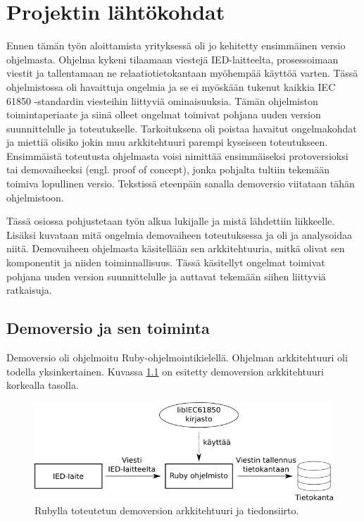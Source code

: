 \chapter{Projektin lähtökohdat}
\label{ch:projektin-lähtökohdat}
Ennen tämän työn aloittamista yrityksessä oli jo kehitetty ensimmäinen versio ohjelmasta. Ohjelma kykeni tilaamaan viestejä IED-laitteelta, prosessoimaan viestit ja tallentamaan ne relaatiotietokantaan myöhempää käyttöä varten. Tässä ohjelmistossa oli havaittuja ongelmia ja se ei myöskään tukenut kaikkia IEC 61850 -standardin viesteihin liittyviä ominaisuuksia. Tämän ohjelmiston toimintaperiaate ja siinä olleet ongelmat toimivat pohjana uuden version suunnittelulle ja toteutukselle. Tarkoituksena oli poistaa havaitut ongelmakohdat ja miettiä olisiko jokin muu arkkitehtuuri parempi kyseiseen toteutukseen. Ensimmäistä toteutusta ohjelmasta voisi nimittää ensimmäiseksi protoversioksi tai demovaiheeksi (engl. proof of concept), jonka pohjalta tultiin tekemään toimiva lopullinen versio. Tekstissä eteenpäin sanalla demoversio viitataan tähän ohjelmistoon.

Tässä osiossa pohjustetaan työn alkua lukijalle ja mistä lähdettiin liikkeelle. Lisäksi kuvataan mitä ongelmia demovaiheen toteutuksessa ja oli ja analysoidaa niitä. Demovaiheen ohjelmasta käsitellään sen arkkitehtuuria, mitkä olivat sen komponentit ja niiden toiminnallisuus. Tässä käsitellyt ongelmat toimivat pohjana uuden version suunnittelulle ja auttavat tekemään siihen liittyviä ratkaisuja.


\section{Demoversio ja sen toiminta}
\label{ch:demoversio-ja-sen-toiminta}
Demoversio oli ohjelmoitu Ruby-ohjelmointikielellä. Ohjelman arkkitehtuuri oli todella yksinkertainen. Kuvassa \ref{fig:demo-architecture} on esitetty demoversion arkkitehtuuri korkealla tasolla.

\begin{figure}[ht!]
	\includegraphics[width=1\textwidth]{pictures/demo-architecture.png}
	\caption{Rubylla toteutetun demoversion arkkitehtuuri ja tiedonsiirto.}
	\label{fig:demo-architecture}
\end{figure}

